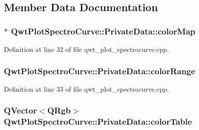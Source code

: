 \subsection{Member Data Documentation}
\hypertarget{class_qwt_plot_spectro_curve_1_1_private_data_a486ecd36a51b89d01bd0c55a6d780056}{
\subsubsection[{color\-Map}]{$\ast$ Qwt\-Plot\-Spectro\-Curve\-::\-Private\-Data\-::color\-Map}}\label{class_qwt_plot_spectro_curve_1_1_private_data_a486ecd36a51b89d01bd0c55a6d780056}


Definition at line 32 of file qwt\-\_\-plot\-\_\-spectrocurve.\-cpp.

\hypertarget{class_qwt_plot_spectro_curve_1_1_private_data_a72415fa72a4fe4f9aa93553743eb1b79}{
\subsubsection[{color\-Range}]{ Qwt\-Plot\-Spectro\-Curve\-::\-Private\-Data\-::color\-Range}}\label{class_qwt_plot_spectro_curve_1_1_private_data_a72415fa72a4fe4f9aa93553743eb1b79}


Definition at line 33 of file qwt\-\_\-plot\-\_\-spectrocurve.\-cpp.

\hypertarget{class_qwt_plot_spectro_curve_1_1_private_data_aaaf9c9aba91c94c80a6cb98270e7cc03}{
\subsubsection[{color\-Table}]{\setlength{\rightskip}{0pt plus 5cm}Q\-Vector$<$Q\-Rgb$>$ Qwt\-Plot\-Spectro\-Curve\-::\-Private\-Data\-::color\-Table}}\label{class_qwt_plot_spectro_curve_1_1_private_data_aaaf9c9aba91c94c80a6cb98270e7cc03}


